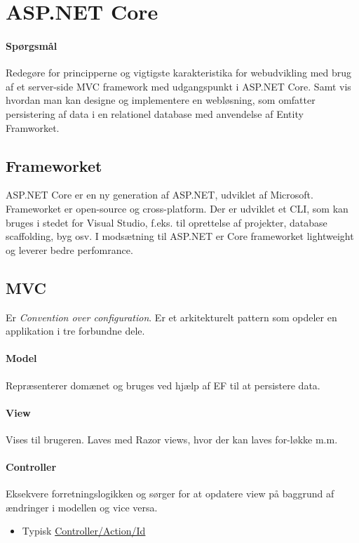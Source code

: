 \section{ASP.NET Core}

\paragraph{Spørgsmål}
Redegøre for principperne og vigtigste karakteristika for webudvikling med brug af et server-side MVC framework med udgangspunkt i ASP.NET Core. Samt vis hvordan man kan designe og implementere en	webløsning, som omfatter persistering af data i en relationel database med anvendelse af Entity Framworket.

\subsection{Frameworket}
ASP.NET Core er en ny generation af ASP.NET, udviklet af Microsoft. Frameworket er open-source og cross-platform.
Der er udviklet et CLI, som kan bruges i stedet for Visual Studio, f.eks. til oprettelse af projekter, database scaffolding, byg osv.
I modsætning til ASP.NET er Core frameworket lightweight og leverer bedre perfomrance.

\subsection{MVC}
Er \textit{Convention over configuration}. Er et arkitekturelt pattern som opdeler en applikation i tre forbundne dele.

\paragraph{Model} Repræsenterer domænet og bruges ved hjælp af EF til at persistere data.

\paragraph{View} Vises til brugeren. Laves med Razor views, hvor der kan laves for-løkke m.m.

\paragraph{Controller} Eksekvere forretningslogikken og sørger for at opdatere view på baggrund af ændringer i modellen og vice versa.

\begin{itemize}
	\item Typisk \url{Controller/Action/Id}
\end{itemize}

